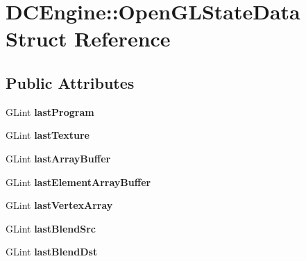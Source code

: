 \hypertarget{structDCEngine_1_1OpenGLStateData}{\section{D\-C\-Engine\-:\-:Open\-G\-L\-State\-Data Struct Reference}
\label{structDCEngine_1_1OpenGLStateData}
}
\subsection*{Public Attributes}
\begin{DoxyCompactItemize}
\item 
\hypertarget{structDCEngine_1_1OpenGLStateData_aaf6b53bf3a1a8e010e249ba720d7d492}{G\-Lint {\bfseries last\-Program}}\label{structDCEngine_1_1OpenGLStateData_aaf6b53bf3a1a8e010e249ba720d7d492}

\item 
\hypertarget{structDCEngine_1_1OpenGLStateData_abb5de27bebef0b596da94151289170b6}{G\-Lint {\bfseries last\-Texture}}\label{structDCEngine_1_1OpenGLStateData_abb5de27bebef0b596da94151289170b6}

\item 
\hypertarget{structDCEngine_1_1OpenGLStateData_a14bd48a70c66f2c8ff038b77fc0dfc93}{G\-Lint {\bfseries last\-Array\-Buffer}}\label{structDCEngine_1_1OpenGLStateData_a14bd48a70c66f2c8ff038b77fc0dfc93}

\item 
\hypertarget{structDCEngine_1_1OpenGLStateData_aebf2c904c49deebff1747a0860c3b429}{G\-Lint {\bfseries last\-Element\-Array\-Buffer}}\label{structDCEngine_1_1OpenGLStateData_aebf2c904c49deebff1747a0860c3b429}

\item 
\hypertarget{structDCEngine_1_1OpenGLStateData_a3e86d39a25a47dae57ca2ff4e584d27b}{G\-Lint {\bfseries last\-Vertex\-Array}}\label{structDCEngine_1_1OpenGLStateData_a3e86d39a25a47dae57ca2ff4e584d27b}

\item 
\hypertarget{structDCEngine_1_1OpenGLStateData_a1d3466426659a3ebab5696a3d3a737c8}{G\-Lint {\bfseries last\-Blend\-Src}}\label{structDCEngine_1_1OpenGLStateData_a1d3466426659a3ebab5696a3d3a737c8}

\item 
\hypertarget{structDCEngine_1_1OpenGLStateData_a843b0ffd34127fb43ec0340e299d1ed8}{G\-Lint {\bfseries last\-Blend\-Dst}}\label{structDCEngine_1_1OpenGLStateData_a843b0ffd34127fb43ec0340e299d1ed8}


\end{DoxyCompactItemize}
